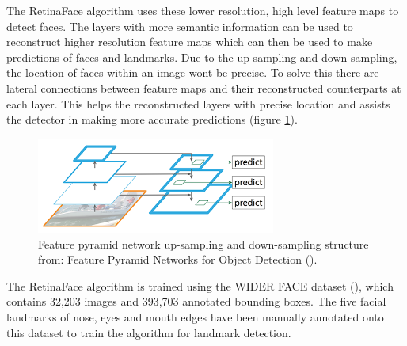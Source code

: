 \documentclass{l4proj}
\begin{document}
The RetinaFace algorithm uses these lower resolution, high level feature maps to detect faces. The layers with more semantic information can be used to reconstruct higher resolution feature maps which can then be used to make predictions of faces and landmarks. Due to the up-sampling and down-sampling, the location of faces within an image wont be precise. To solve this there are lateral connections between feature maps and their reconstructed counterparts at each layer. This helps the reconstructed layers with precise location and assists the detector in making more accurate predictions (figure \ref{ip_lateral}).
\begin{figure}[h!]
  \centering
  \begin{minipage}{\textwidth}
  \centering
    \includegraphics[width=0.7\textwidth]{images/fp_lateral.png}
    \caption{Feature pyramid network up-sampling and down-sampling structure from: Feature Pyramid Networks for Object Detection
(\cite{fpn}). }
    \label{ip_lateral}
  \end{minipage}
  \hfill
\end{figure}


The RetinaFace algorithm is trained using the WIDER FACE dataset (\cite{widerface}), which contains 32,203 images and 393,703 annotated bounding boxes. The five facial landmarks of nose, eyes and mouth edges have been manually annotated onto this dataset to train the algorithm for landmark detection.
\end{document}
